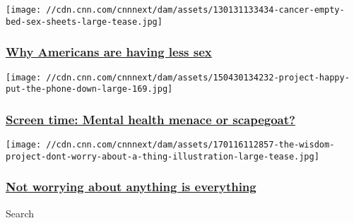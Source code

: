 \href{/2017/07/19/health/americans-less-sex-kerner/index.html}{}

\texttt{[image: //cdn.cnn.com/cnnnext/dam/assets/130131133434-cancer-empty-bed-sex-sheets-large-tease.jpg]}

\hypertarget{why-americans-are-having-less-sex}{%
\subsubsection{\texorpdfstring{\href{/2017/07/19/health/americans-less-sex-kerner/index.html}{Why
Americans are having less
sex}}{Why Americans are having less sex}}\label{why-americans-are-having-less-sex}}

\href{/2018/01/22/health/smartphone-screen-time-happiness-study/index.html}{}

\texttt{[image: //cdn.cnn.com/cnnnext/dam/assets/150430134232-project-happy-put-the-phone-down-large-169.jpg]}

\hypertarget{screen-time-mental-health-menace-or-scapegoat}{%
\subsubsection{\texorpdfstring{\href{/2018/01/22/health/smartphone-screen-time-happiness-study/index.html}{Screen
time: Mental health menace or
scapegoat?}}{Screen time: Mental health menace or scapegoat?}}\label{screen-time-mental-health-menace-or-scapegoat}}

\href{/2017/01/18/health/no-worries-wisdom-project/index.html}{}

\texttt{[image: //cdn.cnn.com/cnnnext/dam/assets/170116112857-the-wisdom-project-dont-worry-about-a-thing-illustration-large-tease.jpg]}

\hypertarget{not-worrying-about-anything-is-everything}{%
\subsubsection{\texorpdfstring{\href{/2017/01/18/health/no-worries-wisdom-project/index.html}{Not
worrying about anything is
everything}}{Not worrying about anything is everything}}\label{not-worrying-about-anything-is-everything}}

Search

